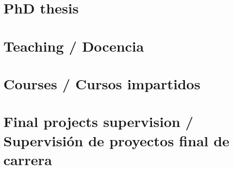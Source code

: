 \documentclass{article}
\begin{document}
\section{PhD thesis}


\section{Teaching / Docencia}


\renewcommand{\refname}{}
\section{Courses / Cursos impartidos}


\renewcommand{\refname}{}
\section{Final projects supervision / Supervisión de proyectos final de carrera}

\end{document}
